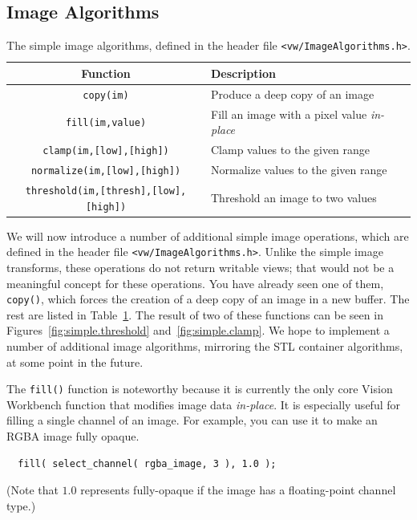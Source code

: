 \subsection{Image Algorithms}

\begin{table}[t]\begin{centering}
\begin{tabular}{|c|l|l|} \hline
Function & Description \\ \hline \hline
\verb#copy(im)# & Produce a deep copy of an image \\ \hline
\verb#fill(im,value)# & Fill an image with a pixel value {\it in-place} \\ \hline
\verb#clamp(im,[low],[high])# & Clamp values to the given range \\ \hline
\verb#normalize(im,[low],[high])# & Normalize values to the given range \\ \hline
\verb#threshold(im,[thresh],[low],[high])# & Threshold an image to two values \\ \hline
\end{tabular}
\caption{The simple image algorithms, defined in the header file {\tt <vw/ImageAlgorithms.h>}.}
\label{tbl:image-algorithms}
\end{centering}\end{table}

We will now introduce a number of additional simple image operations,
which are defined in the header file \verb#<vw/ImageAlgorithms.h>#.
Unlike the simple image transforms, these operations do not return
writable views; that would not be a meaningful concept for these
operations.  You have already seen one of them, \verb#copy()#, which
forces the creation of a deep copy of an image in a new buffer.  The
rest are listed in Table~\ref{tbl:image-algorithms}.  The result of
two of these functions can be seen in
Figures~\ref{fig:simple.threshold} and~\ref{fig:simple.clamp}.  We hope to
implement a number of additional image algorithms, mirroring the STL
container algorithms, at some point in the future.

The \verb#fill()# function is noteworthy because it is currently the
only core Vision Workbench function that modifies image data {\it
  in-place}.  It is especially useful for filling a single channel of
an image.  For example, you can use it to make an RGBA image fully
opaque.
\begin{verbatim}
  fill( select_channel( rgba_image, 3 ), 1.0 );
\end{verbatim}
(Note that $1.0$ represents fully-opaque if the image has a 
floating-point channel type.)

